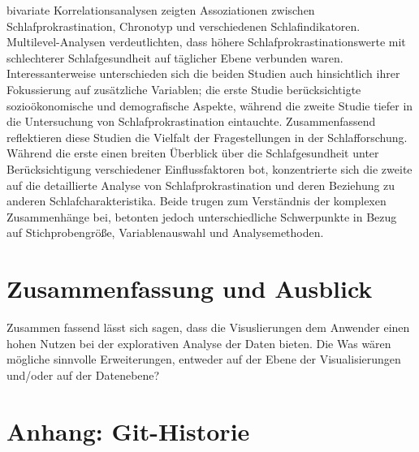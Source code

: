 \documentclass[usegeometry=true]{scrartcl}
\begin{document}
 bivariate Korrelationsanalysen zeigten Assoziationen zwischen Schlafprokrastination, Chronotyp und verschiedenen Schlafindikatoren. 
 Multilevel-Analysen verdeutlichten, dass höhere Schlafprokrastinationswerte mit schlechterer Schlafgesundheit auf täglicher 
 Ebene verbunden waren. Interessanterweise unterschieden sich die beiden Studien auch hinsichtlich ihrer Fokussierung auf 
 zusätzliche Variablen; die erste Studie berücksichtigte sozioökonomische und demografische Aspekte, während die zweite Studie tiefer
  in die Untersuchung von Schlafprokrastination eintauchte.
\newline
Zusammenfassend reflektieren diese Studien die Vielfalt der Fragestellungen in der Schlafforschung. Während die erste einen breiten Überblick über die Schlafgesundheit unter Berücksichtigung verschiedener Einflussfaktoren bot, konzentrierte sich die zweite auf die detaillierte Analyse von Schlafprokrastination und deren Beziehung zu anderen Schlafcharakteristika. Beide trugen zum Verständnis der komplexen Zusammenhänge bei, betonten jedoch unterschiedliche Schwerpunkte in Bezug auf Stichprobengröße, Variablenauswahl und Analysemethoden.

\section{Zusammenfassung und Ausblick}
Zusammen fassend lässt sich sagen, dass die Visuslierungen dem Anwender einen hohen Nutzen bei der explorativen Analyse der Daten bieten.
Die 
Was wären mögliche sinnvolle Erweiterungen, entweder auf der Ebene der Visualisierungen und/oder auf der Datenebene?

\section*{Anhang: Git-Historie}

\printbibliography
\end{document}
